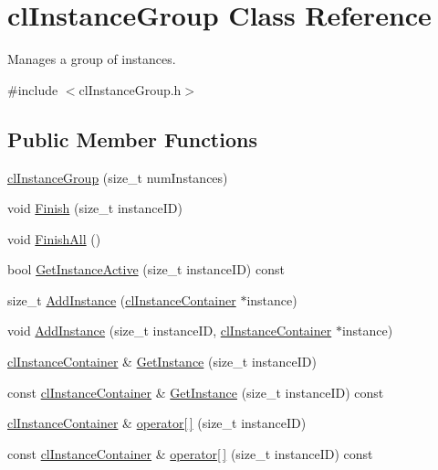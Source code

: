 \hypertarget{classcl_instance_group}{
\section{clInstanceGroup Class Reference}
\label{classcl_instance_group}
}


Manages a group of instances.  




{\ttfamily \#include $<$clInstanceGroup.h$>$}

\subsection*{Public Member Functions}
\begin{DoxyCompactItemize}
\item 
\hyperlink{classcl_instance_group_a0625e0c938c7fc6eb422ce9551bb0ec0}{clInstanceGroup} (size\_\-t numInstances)
\item 
void \hyperlink{classcl_instance_group_af10a11ad3a6b5cbc8b9bea047d084a26}{Finish} (size\_\-t instanceID)
\item 
void \hyperlink{classcl_instance_group_acbba525b4e73209aade3391cfdddc341}{FinishAll} ()
\item 
bool \hyperlink{classcl_instance_group_a94ad998c4ffa0ce90a5268c3a0b2f27f}{GetInstanceActive} (size\_\-t instanceID) const 
\item 
size\_\-t \hyperlink{classcl_instance_group_ae81d532e520c320cecadc88f279443fe}{AddInstance} (\hyperlink{classcl_instance_container}{clInstanceContainer} $\ast$instance)
\item 
void \hyperlink{classcl_instance_group_a718e4f32d58b4123f80dc12b186d1f45}{AddInstance} (size\_\-t instanceID, \hyperlink{classcl_instance_container}{clInstanceContainer} $\ast$instance)
\item 
\hyperlink{classcl_instance_container}{clInstanceContainer} \& \hyperlink{classcl_instance_group_ad30209cfb0f444dec07ee58315311f98}{GetInstance} (size\_\-t instanceID)
\item 
const \hyperlink{classcl_instance_container}{clInstanceContainer} \& \hyperlink{classcl_instance_group_a2450c29ea13ee6e5e74c0279815f4272}{GetInstance} (size\_\-t instanceID) const 
\item 
\hyperlink{classcl_instance_container}{clInstanceContainer} \& \hyperlink{classcl_instance_group_a141569d6b0c62a717288a26185bb7ae9}{operator\mbox{[}$\,$\mbox{]}} (size\_\-t instanceID)
\item 
const \hyperlink{classcl_instance_container}{clInstanceContainer} \& \hyperlink{classcl_instance_group_ab963627e2039814e1ab8b2b61bf201c0}{operator\mbox{[}$\,$\mbox{]}} (size\_\-t instanceID) const 
\end{DoxyCompactItemize}
